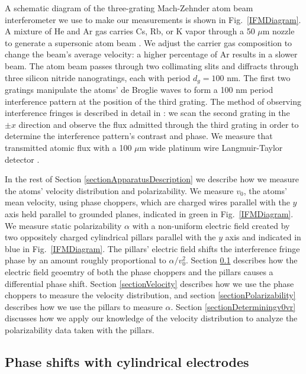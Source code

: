 \documentclass[twocolumn,pra,showpacs,superscriptaddress,longbibliography]{revtex4-1}   %
\newcommand{\figref}[1]{Fig.~\ref{#1}}
\begin{document}
A schematic diagram of the three-grating Mach-Zehnder atom beam interferometer we use to make our measurements is shown in \figref{IFMDiagram}. 
A mixture of He and Ar gas carries Cs, Rb, or K vapor through a 50 $\mu$m nozzle to generate a supersonic atom beam \cite{Scoles,Ekstrom1993}. We adjust the carrier gas composition to change the beam's average velocity: a higher percentage of Ar results in a slower beam.
The atom beam passes through two collimating slits and diffracts through three silicon nitride nanogratings, each with period $d_g = 100$ nm.
The first two gratings manipulate the atoms' de Broglie waves to form a 100 nm period interference pattern at the position of the third grating. 
The method of observing interference fringes is described in detail in \cite{Kokorowski2001}: we scan the second grating in the $\pm x$ direction and observe the flux admitted through the third grating in order to determine the interference pattern's contrast and phase.
We measure that transmitted atomic flux with a 100 $\mu$m wide platinum wire Langmuir-Taylor detector \cite{Delhuille2002}.

In the rest of Section \ref{sectionApparatusDescription} we describe how we measure the atoms' velocity distribution and polarizability.
We measure $v_0$, the atoms' mean velocity, using phase choppers, which are charged wires parallel with the $y$ axis held parallel to grounded planes, indicated in green in \figref{IFMDiagram}.
We measure static polarizability $\alpha$ with a non-uniform electric field created by two oppositely charged cylindrical pillars parallel with the $y$ axis and indicated in blue in \figref{IFMDiagram}. The pillars' electric field shifts the interference fringe phase by an amount roughly proportional to $\alpha/v_0^2$. 
Section \ref{sectionPhaseShifts} describes how the electric field geoemtry of both the phase choppers and the pillars causes a differential phase shift. Section \ref{sectionVelocity} describes how we use the phase choppers to measure the velocity distribution, and section \ref{sectionPolarizability} describes how we use the pillars to measure $\alpha$. Section \ref{sectionDeterminingv0vr} discusses how we apply our knowledge of the velocity distribution to analyze the polarizability data taken with the pillars.


\subsection{Phase shifts with cylindrical electrodes} \label{sectionPhaseShifts}
\end{document}

